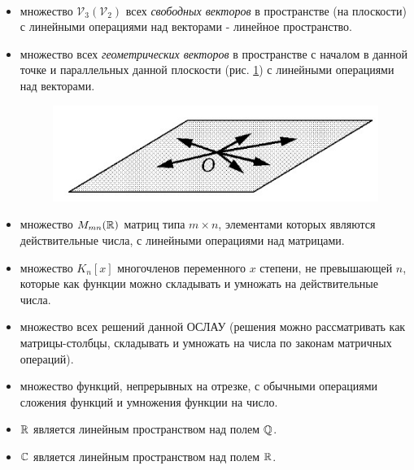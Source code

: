 \begin{example}~
    \begin{itemize}[nosep]
        \item множество $\mathcal{V}_3 (\mathcal{V}_2)$ всех \textit{свободных векторов} в пространстве (на плоскости) с линейными операциями над векторами - линейное пространство.
        
        \item множество всех \textit{геометрических векторов} в пространстве с началом в данной точке и параллельных данной плоскости (рис. \ref{fig:picture_2_1}) с линейными операциями над векторами.
        \begin{figure}[H]
            \centering
            \includegraphics[scale=0.5]{images/2_1.jpg}
            \label{fig:picture_2_1}
            \caption{}
        \end{figure}

        \item множество $M_{mn}(\mathbb{R})$ матриц типа $m \times n$, элементами которых являются действительные числа, с линейными операциями над матрицами.

        \item множество $K_n[x]$ многочленов переменного $x$ степени, не превышающей $n$, которые как функции можно складывать и умножать на действительные числа.

        \item множество всех решений данной ОСЛАУ (решения можно рассматривать как матрицы-столбцы, складывать и умножать на числа по законам матричных операций).

        \item множество функций, непрерывных на отрезке, с обычными операциями сложения функций и умножения функции на число.

        \item $\mathbb{R}$ является линейным пространством над полем $\mathbb{Q}$.
        
        \item $\mathbb{C}$ является линейным пространством над полем $\mathbb{R}$.
    \end{itemize}
\end{example}


